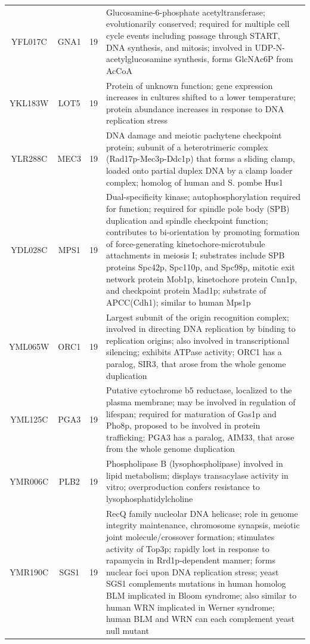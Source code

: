 \documentclass[]{article}
\begin{document}
\begin{longtable}{@{\extracolsep{3pt}} cccp{85mm}}
YFL017C & GNA1 & 19 & Glucosamine-6-phosphate acetyltransferase; evolutionarily conserved; required for multiple cell cycle events including passage through START, DNA synthesis, and mitosis; involved in UDP-N-acetylglucosamine synthesis, forms GlcNAc6P from AcCoA \\ 
YKL183W & LOT5 & 19 & Protein of unknown function; gene expression increases in cultures shifted to a lower temperature; protein abundance increases in response to DNA replication stress \\ 
YLR288C & MEC3 & 19 & DNA damage and meiotic pachytene checkpoint protein; subunit of a heterotrimeric complex (Rad17p-Mec3p-Ddc1p) that forms a sliding clamp, loaded onto partial duplex DNA by a clamp loader complex; homolog of human and S. pombe Hus1 \\ 
YDL028C & MPS1 & 19 & Dual-specificity kinase; autophosphorylation required for function; required for spindle pole body (SPB) duplication and spindle checkpoint function; contributes to bi-orientation by promoting formation of force-generating kinetochore-microtubule attachments in meiosis I; substrates include SPB proteins Spc42p, Spc110p, and Spc98p, mitotic exit network protein Mob1p, kinetochore protein Cnn1p, and checkpoint protein Mad1p; substrate of APCC(Cdh1); similar to human Mps1p \\ 
YML065W & ORC1 & 19 & Largest subunit of the origin recognition complex; involved in directing DNA replication by binding to replication origins; also involved in transcriptional silencing; exhibits ATPase activity; ORC1 has a paralog, SIR3, that arose from the whole genome duplication \\ 
YML125C & PGA3 & 19 & Putative cytochrome b5 reductase, localized to the plasma membrane; may be involved in regulation of lifespan; required for maturation of Gas1p and Pho8p, proposed to be involved in protein trafficking; PGA3 has a paralog, AIM33, that arose from the whole genome duplication \\ 
YMR006C & PLB2 & 19 & Phospholipase B (lysophospholipase) involved in lipid metabolism; displays transacylase activity in vitro; overproduction confers resistance to lysophosphatidylcholine \\ 
YMR190C & SGS1 & 19 & RecQ family nucleolar DNA helicase; role in genome integrity maintenance, chromosome synapsis, meiotic joint molecule/crossover formation; stimulates activity of Top3p; rapidly lost in response to rapamycin in Rrd1p-dependent manner; forms nuclear foci upon DNA replication stress; yeast SGS1 complements mutations in human homolog BLM implicated in Bloom syndrome; also similar to human WRN implicated in Werner syndrome; human BLM and WRN can each complement yeast null mutant \\ 

\end{longtable}
\end{document}
